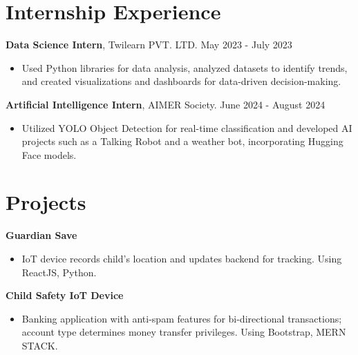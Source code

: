 \documentclass{article}
\begin{document}
\section*{Internship Experience}
\vspace{-2mm} %
\textbf{Data Science Intern}, Twilearn PVT. LTD. \hfill May 2023 - July 2023 \\
\vspace{-6mm} %
\begin{itemize}
    \item Used Python libraries for data analysis, analyzed datasets to identify trends, and created visualizations and dashboards for data-driven decision-making.
\end{itemize}
\textbf{Artificial Intelligence Intern}, AIMER Society. \hfill June 2024 - August 2024 \\
\vspace{-6mm} %
\begin{itemize}
    \item Utilized YOLO Object Detection for real-time classification and developed AI projects such as a Talking Robot and a weather bot, incorporating Hugging Face models.
\end{itemize}
\hline
\vspace{-2mm}
\section*{Projects}
\vspace{-1mm}
{\fontsize{12}{12}\selectfont \textbf{Guardian Save}}
\vspace{-1mm}
\begin{itemize}
    \item IoT device records child's location and updates backend for tracking. Using ReactJS, Python.
\end{itemize}
{\fontsize{12}{12}\selectfont \textbf{Child Safety IoT Device}}
\vspace{-1mm}
\begin{itemize}
    \item Banking application with anti-spam features for bi-directional transactions; account type determines money transfer privileges. Using Bootstrap, MERN STACK.
\end{itemize}
\hline
\vspace{-2mm}
\end{document}
